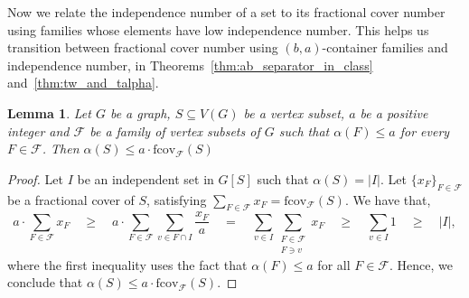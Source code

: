 \documentclass[11pt]{amsart}
\newtheorem{theorem}{Theorem}[section]
\newtheorem{lemma}[theorem]{Lemma}
\newcommand{\cal}{\mathcal}
\begin{document}
Now we relate the independence number of a set to its fractional cover number using families whose elements have low independence number. This helps us transition between fractional cover number using $(b,a)$-container families and independence number, in Theorems~\ref{thm:ab_separator_in_class} and~\ref{thm:tw_and_talpha}.

\begin{lemma}\label{lem:fractional_cover_independence_bound}
    Let $G$ be a graph, $S\subseteq V(G)$ be a vertex subset, $a$ be a positive integer and $\mathcal{F}$ be a family of vertex subsets of $G$ such that $\alpha(F)\leq a$ for every $F\in\mathcal{F}$. Then $\alpha(S) \leq a \cdot \mathrm{fcov}_{\mathcal{F}}(S)$
\end{lemma}
\begin{proof}
    Let $I$ be an independent set in $G[S]$ such that $\alpha(S) = |I|$. Let $\{x_F\}_{F \in \mathcal{F}}$ be a fractional cover of $S$, satisfying $\sum_{F \in \cal F} x_F = \mathrm{fcov}_{\cal F}(S)$. We have that,
    $$
    a \cdot \sum_{F \in \cal F} x_F \quad
    \geq \quad a \cdot \sum_{F \in {\cal F}} \sum_{v \in F \cap I} \frac{x_F}{a} \quad
    = \quad \sum_{v \in I} \sum_{\substack{F \in {\cal F} \\ F \ni v}} x_F \quad
    \geq \quad \sum_{v \in I} 1 \quad
    \geq \quad |I|,
    $$
    where the first inequality uses the fact that $\alpha(F) \leq a$ for all $F \in \mathcal{F}$. Hence, we conclude that $\alpha(S) \leq a \cdot \mathrm{fcov}_{\mathcal{F}}(S)$.
\end{proof}

\MainThmSeparator*


\end{document}
